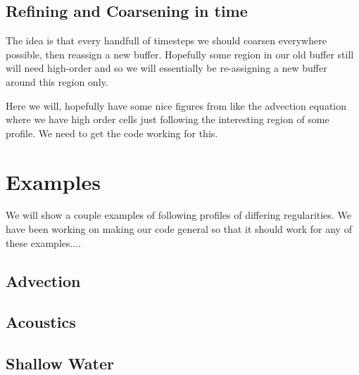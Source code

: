 \documentclass[10]{amsart}
\begin{document}
\subsection{Refining and Coarsening in time}

The idea is that every handfull of timesteps we should coarsen everywhere possible, then reassign a new buffer.
Hopefully some region in our old buffer still will need high-order and so we will essentially be re-assigning a new
buffer around this region only.

Here we will, hopefully have some nice figures from like the advection equation where we have high order cells just following
the interesting region of some profile. We need to get the code working for this.

\section{Examples}

We will show a couple examples of following profiles of differing regularities. We have been working on
making our code general so that it should work for any of these examples....

\subsection{Advection}



\subsection{Acoustics}



\subsection{Shallow Water}
\end{document}
